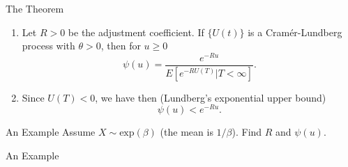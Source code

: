 \documentclass[11pt]{beamer}
\begin{document}
\begin{frame}{The Theorem}
\begin{enumerate}
\item Let $R > 0$ be the adjustment coefficient. If $\{U(t)\}$ is a Cram\'er-Lundberg process with $\theta>0$, then for $u\ge 0$
$$\psi(u)=\frac{e^{-Ru}}{E\left[ e^{-R U(T)} | T<\infty\right]}.$$
\item Since $U(T)<0$, we have then (Lundberg's exponential upper bound)
$$\psi(u)< e^{-Ru}.$$
\end{enumerate}
\end{frame}
\begin{frame}{An Example} 
\vspace{- 4.5 cm}
Assume $X\sim\text{exp}(\beta)$ (the mean is $1/\beta$). Find $R$ and $\psi(u)$.

\end{frame}
\begin{frame}{An Example}

\end{frame}
\end{document}
